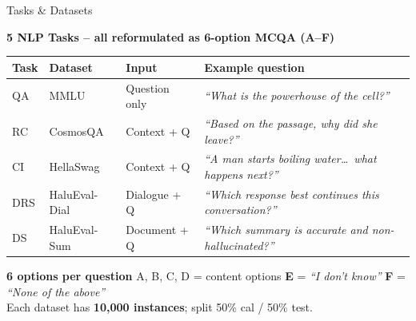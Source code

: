 \documentclass{beamer}
\begin{document}
\begin{frame}{Tasks \& Datasets}

\begin{block}{\textbf{5 NLP Tasks -- all reformulated as 6-option MCQA (A--F)}}
\scriptsize
\renewcommand{\arraystretch}{1.3}
\begin{tabular}{@{}llll@{}}
\toprule
\textbf{Task} & \textbf{Dataset} & \textbf{Input} & \textbf{Example question} \\
\midrule
QA  & MMLU        & Question only &
  \textit{``What is the powerhouse of the cell?''} \\
RC  & CosmosQA    & Context + Q &
  \textit{``Based on the passage, why did she leave?''} \\
CI  & HellaSwag   & Context + Q &
  \textit{``A man starts boiling water\ldots\ what happens next?''} \\
DRS & HaluEval-Dial & Dialogue + Q &
  \textit{``Which response best continues this conversation?''} \\
DS  & HaluEval-Sum & Document + Q &
  \textit{``Which summary is accurate and non-hallucinated?''} \\
\bottomrule
\end{tabular}
\end{block}

\smallskip

\begin{block}{\textbf{6 options per question}}
\small
A, B, C, D = content options \quad
\textbf{E} = \textit{``I don't know''} \quad
\textbf{F} = \textit{``None of the above''}\\
\smallskip
Each dataset has \textbf{10,000 instances}; split 50\% cal / 50\% test.
\end{block}

\end{frame}
\end{document}

